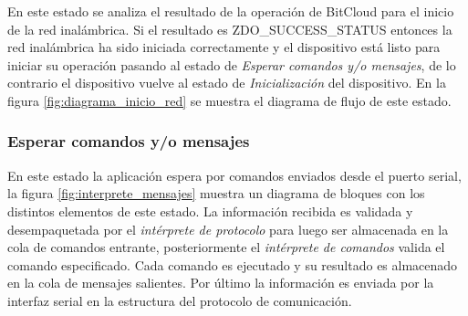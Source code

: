 En este estado se analiza el resultado de la operación de BitCloud para el inicio de la red inalámbrica. Si el resultado es ZDO\_SUCCESS\_STATUS entonces la red inalámbrica ha sido iniciada correctamente y el dispositivo está listo para iniciar su operación pasando al estado de \textit{Esperar comandos y/o mensajes}, de lo contrario el dispositivo vuelve al estado de \textit{Inicialización} del dispositivo. En la figura \ref{fig:diagrama_inicio_red} se muestra el diagrama de flujo de este estado.


\subsubsection{Esperar comandos y/o mensajes}

En este estado la aplicación espera por comandos enviados desde el puerto serial, la figura \ref{fig:interprete_mensajes} muestra un diagrama de bloques con los distintos elementos de este estado. La información recibida es validada y desempaquetada por el \textit{intérprete de protocolo} para luego ser almacenada en la cola de comandos entrante, posteriormente el \textit{intérprete de comandos} valida el comando especificado. Cada comando es ejecutado y su resultado es almacenado en la cola de mensajes salientes. Por último la información es enviada por la interfaz serial en la estructura del protocolo de comunicación.  

